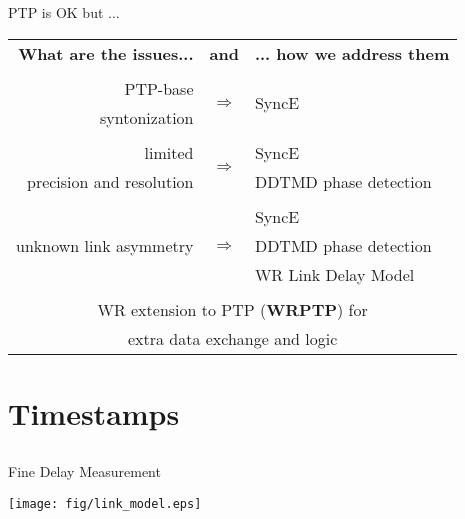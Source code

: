 \documentclass[compress,red]{beamer}
\begin{document}
\begin{frame}{PTP is OK but ...}

  \resizebox{11cm}{!} 
  {
    \begin{tabular}{ r c l }
  {\bf What are the issues...} 	& {\bf and}      & {\bf ... how we address them}  \\
				&     		 &        \\
      PTP-base		 	& \multirow{2}{*}{$\Rightarrow$}  & \multirow{2}{*}{SyncE }\\
      syntonization	        &      		 &        \\
				&      		 &        			\\
      limited             	&\multirow{2}{*}{$\Rightarrow$}  	 & SyncE \\
      precision and resolution  &      		 & DDTMD phase detection\\
				&    		 &        \\
			        &      		 & SyncE  \\
      unknown link asymmetry    & $\Rightarrow$  & DDTMD phase detection \\
				&      		 & WR Link Delay Model \\
				&      		 &        \\
      \multicolumn{3}{c}{WR extension to PTP ({\bf WRPTP}) for } \\
      \multicolumn{3}{c}{extra data exchange and logic} \\
    \end{tabular}
  }
\end{frame}
\section{Timestamps}
\subsection{}
\begin{frame}{Fine Delay Measurement}

  \begin{center}
  \texttt{[image: fig/link\_model.eps]}
  \end{center}

\end{frame}
\end{document}
